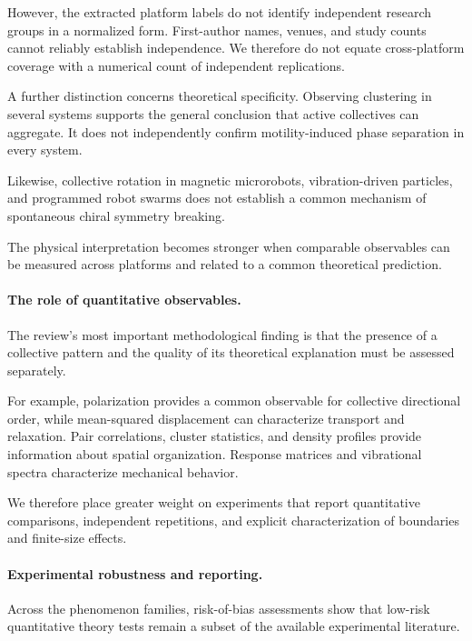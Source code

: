 However, the extracted platform
labels do not identify
independent research groups
in a normalized form.
First-author names,
venues, and study
counts cannot reliably
establish independence.
We therefore do not
equate cross-platform
coverage with a
numerical count of
independent replications.

A further distinction
concerns theoretical
specificity. Observing
clustering in several
systems supports
the general conclusion
that active collectives
can aggregate.
It does not
independently confirm
motility-induced
phase separation
in every system.

Likewise, collective
rotation in magnetic
microrobots,
vibration-driven particles,
and programmed
robot swarms
does not establish
a common mechanism
of spontaneous
chiral symmetry
breaking.

The physical
interpretation becomes
stronger when comparable
observables can be
measured across
platforms and
related to a common
theoretical prediction.

\paragraph*{The role of quantitative observables.}

The review's most important methodological
finding is that the presence of a collective
pattern and the quality of its theoretical
explanation must be assessed separately.

For example, polarization provides
a common observable for
collective directional order,
while mean-squared displacement
can characterize transport
and relaxation.
Pair correlations,
cluster statistics,
and density profiles
provide information
about spatial
organization.
Response matrices
and vibrational
spectra characterize
mechanical behavior.





We therefore place
greater weight on
experiments that
report quantitative
comparisons,
independent repetitions,
and explicit
characterization
of boundaries
and finite-size
effects.



\paragraph*{Experimental robustness and reporting.}

Across the phenomenon families,
risk-of-bias assessments show
that low-risk quantitative
theory tests remain
a subset of the
available experimental
literature.

